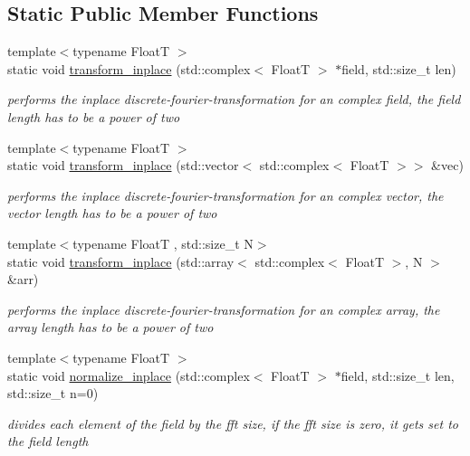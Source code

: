 \subsection*{Static Public Member Functions}
\begin{DoxyCompactItemize}
\item 
{\footnotesize template$<$typename FloatT $>$ }\\static void \hyperlink{structdevfix_1_1dsp_1_1fft_a8e6e4580cc075ebaa7be5d2781a8e3eb}{transform\+\_\+inplace} (std\+::complex$<$ FloatT $>$ $\ast$field, std\+::size\+\_\+t len)
\begin{DoxyCompactList}\small\item\em performs the inplace discrete-\/fourier-\/transformation for an complex field, the field length has to be a power of two \end{DoxyCompactList}\item 
{\footnotesize template$<$typename FloatT $>$ }\\static void \hyperlink{structdevfix_1_1dsp_1_1fft_a3f9d520b7ee8f9fe233bbed45f0c10d8}{transform\+\_\+inplace} (std\+::vector$<$ std\+::complex$<$ FloatT $>$$>$ \&vec)
\begin{DoxyCompactList}\small\item\em performs the inplace discrete-\/fourier-\/transformation for an complex vector, the vector length has to be a power of two \end{DoxyCompactList}\item 
{\footnotesize template$<$typename FloatT , std\+::size\+\_\+t N$>$ }\\static void \hyperlink{structdevfix_1_1dsp_1_1fft_a92d4ff21f87fd2d1607c60788158cf62}{transform\+\_\+inplace} (std\+::array$<$ std\+::complex$<$ FloatT $>$, N $>$ \&arr)
\begin{DoxyCompactList}\small\item\em performs the inplace discrete-\/fourier-\/transformation for an complex array, the array length has to be a power of two \end{DoxyCompactList}\item 
{\footnotesize template$<$typename FloatT $>$ }\\static void \hyperlink{structdevfix_1_1dsp_1_1fft_ac05e043eb9375c77ff7e4ab5843d82af}{normalize\+\_\+inplace} (std\+::complex$<$ FloatT $>$ $\ast$field, std\+::size\+\_\+t len, std\+::size\+\_\+t n=0)
\begin{DoxyCompactList}\small\item\em divides each element of the field by the fft size, if the fft size is zero, it gets set to the field length \end{DoxyCompactList}\item 
$$
\end{DoxyCompactItemize}
